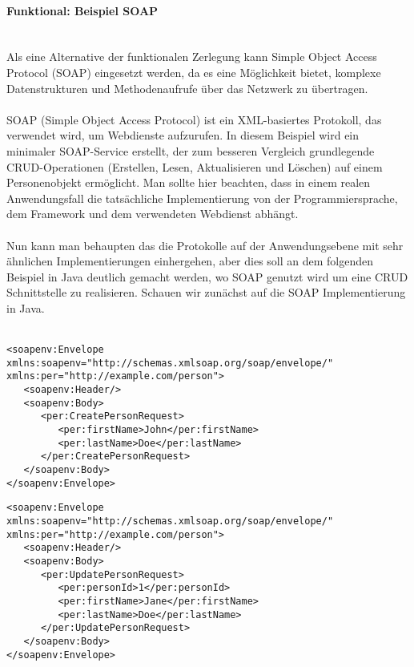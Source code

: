 \documentclass[../vs-script-first-v01.tex]{subfiles}
\begin{document}
\paragraph{Funktional: Beispiel SOAP\\\\}
Als eine Alternative der funktionalen Zerlegung kann Simple Object Access Protocol (SOAP) eingesetzt werden, da es eine Möglichkeit bietet, komplexe Datenstrukturen und Methodenaufrufe über das Netzwerk zu übertragen.
\\\\
SOAP (Simple Object Access Protocol) ist ein XML-basiertes Protokoll, das verwendet wird, um Webdienste aufzurufen. In diesem Beispiel wird ein minimaler SOAP-Service erstellt, der zum besseren Vergleich grundlegende CRUD-Operationen (Erstellen, Lesen, Aktualisieren und Löschen) auf einem Personenobjekt ermöglicht. Man sollte hier beachten, dass in einem realen Anwendungsfall die tatsächliche Implementierung von der Programmiersprache, dem Framework und dem verwendeten Webdienst abhängt.
\\\\
Nun kann man behaupten das die Protokolle auf der Anwendungsebene mit sehr ähnlichen Implementierungen einhergehen, aber dies soll an dem folgenden Beispiel in Java deutlich gemacht werden, wo SOAP genutzt wird um eine CRUD Schnittstelle  zu realisieren. 
Schauen wir zunächst auf die SOAP Implementierung in Java. \\\\
\noindent\begin{minipage}{\textwidth}
\begin{lstlisting}[caption={SOAP create},captionpos=b,label={lst:s_create}]
<soapenv:Envelope xmlns:soapenv="http://schemas.xmlsoap.org/soap/envelope/" xmlns:per="http://example.com/person">
   <soapenv:Header/>
   <soapenv:Body>
      <per:CreatePersonRequest>
         <per:firstName>John</per:firstName>
         <per:lastName>Doe</per:lastName>
      </per:CreatePersonRequest>
   </soapenv:Body>
</soapenv:Envelope>
\end{lstlisting}
\end{minipage}
\noindent\begin{minipage}{\textwidth}
\begin{lstlisting}[caption={SOAP update},captionpos=b,label={lst:s_update}]
<soapenv:Envelope xmlns:soapenv="http://schemas.xmlsoap.org/soap/envelope/" xmlns:per="http://example.com/person">
   <soapenv:Header/>
   <soapenv:Body>
      <per:UpdatePersonRequest>
         <per:personId>1</per:personId>
         <per:firstName>Jane</per:firstName>
         <per:lastName>Doe</per:lastName>
      </per:UpdatePersonRequest>
   </soapenv:Body>
</soapenv:Envelope>
\end{lstlisting}
\end{minipage}
\end{document}
